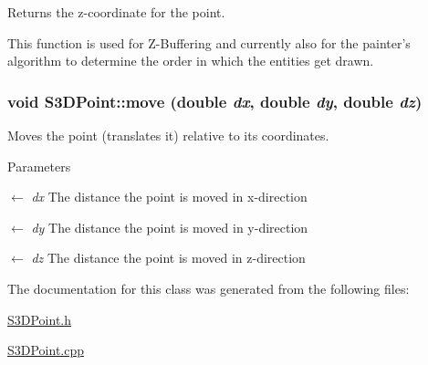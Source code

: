 Returns the z-\/coordinate for the point. 

This function is used for Z-\/Buffering and currently also for the painter's algorithm to determine the order in which the entities get drawn. \hypertarget{class_s3_d_point_a18bbc742cbadc8d49d0600c3f80caf91}{
\subsubsection[{move}]{\setlength{\rightskip}{0pt plus 5cm}void S3DPoint::move (double {\em dx}, \/  double {\em dy}, \/  double {\em dz})}}
\label{class_s3_d_point_a18bbc742cbadc8d49d0600c3f80caf91}


Moves the point (translates it) relative to its coordinates. 


\begin{DoxyParams}{Parameters}
\item[\mbox{$\leftarrow$} {\em dx}]The distance the point is moved in x-\/direction \item[\mbox{$\leftarrow$} {\em dy}]The distance the point is moved in y-\/direction \item[\mbox{$\leftarrow$} {\em dz}]The distance the point is moved in z-\/direction \end{DoxyParams}


The documentation for this class was generated from the following files:\begin{DoxyCompactItemize}
\item 
\hyperlink{_s3_d_point_8h}{S3DPoint.h}\item 
\hyperlink{_s3_d_point_8cpp}{S3DPoint.cpp}\end{DoxyCompactItemize}
